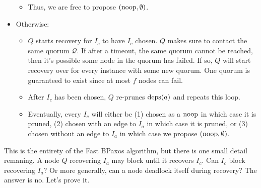 \begin{itemize}
\begin{itemize}
      \item
        Thus, we are free to propose $(\text{noop}, \emptyset)$.
    \end{itemize}
  \item
    Otherwise:
    \begin{itemize}
      \item
        $Q$ starts recovery for $I_c$ to have $I_c$ chosen. $Q$ makes sure to
        contact the same quorum $\mathcal{Q}$. If after a timeout, the same
        quorum cannot be reached, then it's possible some node in the quorum
        has failed. If so, $Q$ will start recovery over for every instance with
        some new quorum. One quorum is guaranteed to exist since at most $f$
        nodes can fail.

      \item
        After $I_c$ has been chosen, $Q$ re-prunes $\text{deps}(a)$ and repeats this
        loop.

      \item
        Eventually, every $I_c$ will either be (1) chosen as a $\text{noop}$ in which
        case it is pruned, (2) chosen with an edge to $I_a$ in which case it is
        pruned, or (3) chosen without an edge to $I_a$ in which case we propose
        $(\text{noop}, \emptyset)$.
    \end{itemize}
\end{itemize}

This is the entirety of the Fast BPaxos algorithm, but there is one small
detail remaning. A node $Q$ recovering $I_a$ may block until it recovers $I_c$.
Can $I_c$ block recovering $I_a$? Or more generally, can a node deadlock itself
during recovery? The answer is no. Let's prove it.

